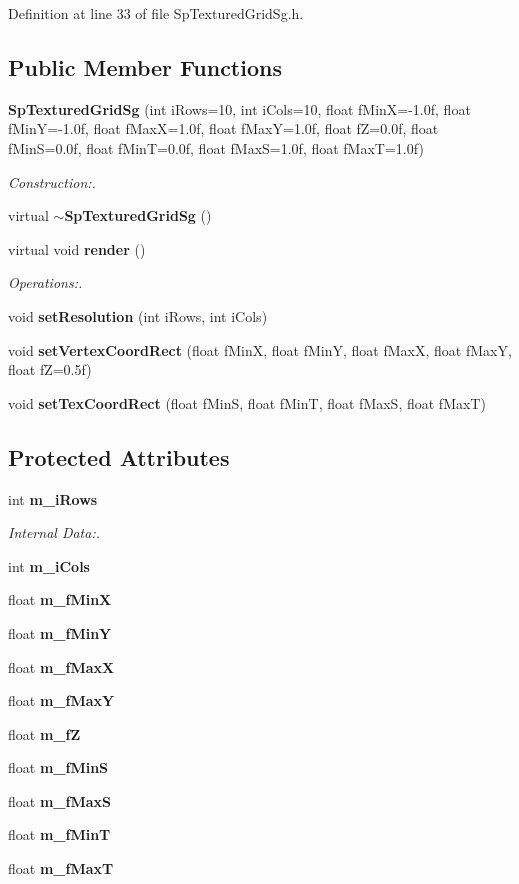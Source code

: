 Definition at line 33 of file Sp\-Textured\-Grid\-Sg.h.\subsection*{Public Member Functions}
\begin{CompactItemize}
\item 
{\bf Sp\-Textured\-Grid\-Sg} (int i\-Rows=10, int i\-Cols=10, float f\-Min\-X=-1.0f, float f\-Min\-Y=-1.0f, float f\-Max\-X=1.0f, float f\-Max\-Y=1.0f, float f\-Z=0.0f, float f\-Min\-S=0.0f, float f\-Min\-T=0.0f, float f\-Max\-S=1.0f, float f\-Max\-T=1.0f)
\begin{CompactList}\small\item\em Construction:. \item\end{CompactList}\item 
virtual {\bf $\sim$Sp\-Textured\-Grid\-Sg} ()
\item 
virtual void {\bf render} ()
\begin{CompactList}\small\item\em Operations:. \item\end{CompactList}\item 
void {\bf set\-Resolution} (int i\-Rows, int i\-Cols)
\item 
void {\bf set\-Vertex\-Coord\-Rect} (float f\-Min\-X, float f\-Min\-Y, float f\-Max\-X, float f\-Max\-Y, float f\-Z=0.5f)
\item 
void {\bf set\-Tex\-Coord\-Rect} (float f\-Min\-S, float f\-Min\-T, float f\-Max\-S, float f\-Max\-T)
\end{CompactItemize}
\subsection*{Protected Attributes}
\begin{CompactItemize}
\item 
int {\bf m\_\-i\-Rows}
\begin{CompactList}\small\item\em Internal Data:. \item\end{CompactList}\item 
int {\bf m\_\-i\-Cols}
\item 
float {\bf m\_\-f\-Min\-X}
\item 
float {\bf m\_\-f\-Min\-Y}
\item 
float {\bf m\_\-f\-Max\-X}
\item 
float {\bf m\_\-f\-Max\-Y}
\item 
float {\bf m\_\-f\-Z}
\item 
float {\bf m\_\-f\-Min\-S}
\item 
float {\bf m\_\-f\-Max\-S}
\item 
float {\bf m\_\-f\-Min\-T}
\item 
float {\bf m\_\-f\-Max\-T}
\end{CompactItemize}


